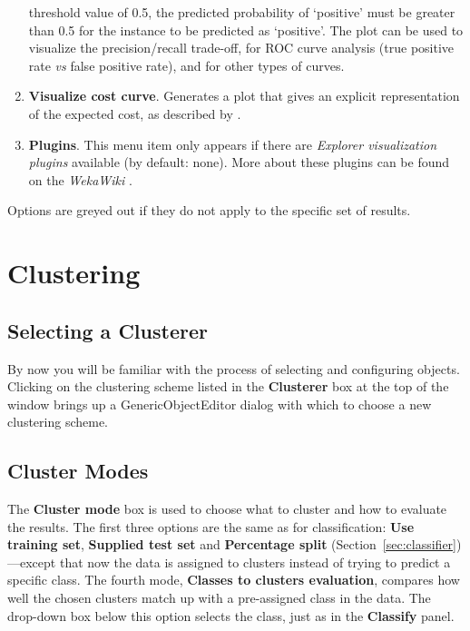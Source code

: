 \documentclass[a4paper]{article}
\begin{document}
\begin{enumerate}
threshold value of 0.5, the predicted probability of `positive' must be greater
than 0.5 for the instance to be predicted as `positive'. The plot can be used
to visualize the precision/recall trade-off, for ROC curve analysis (true
positive rate {\em vs} false positive rate), and for other types of curves. 
\item \textbf{Visualize cost curve}.
Generates a plot that gives an explicit representation of the expected cost, as
described by \cite{drummond}.
\item \textbf{Plugins}.
This menu item only appears if there are \textit{Explorer visualization plugins}
available (by default: none). More about these plugins can be found on the 
\textit{WekaWiki} \cite{wekawiki}.
\end{enumerate}
\noindent
Options are greyed out if they do not apply to the specific set of results.

\newpage

\section{Clustering}

\begin{center}
\end{center}

\subsection{Selecting a Clusterer}

By now you will be familiar with the process of selecting and configuring
objects.  Clicking on the clustering scheme listed in the \textbf{Clusterer}
box at the top of the window brings up a GenericObjectEditor dialog with which
to choose a new clustering scheme.

\subsection{Cluster Modes}

The \textbf{Cluster mode} box is used to choose what to cluster and how to
evaluate the results. The first three options are the same as for
classification: \textbf{Use training set}, \textbf{Supplied test set} and
\textbf{Percentage split} (Section~\ref{sec:classifier})---except that now the
data is assigned to clusters instead of trying to predict a specific class.
The fourth mode, \textbf{Classes to clusters evaluation}, compares how well the
chosen clusters match up with a pre-assigned class in the data.  The drop-down
box below this option selects the class, just as in the \textbf{Classify}
panel.
\end{document}
